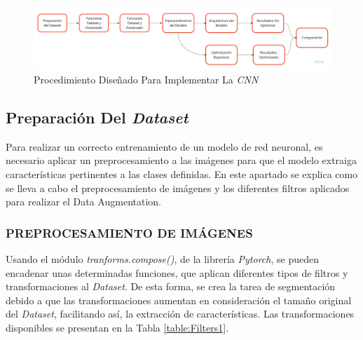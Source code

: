 \begin{figure}[ht]
	\centering
	\includegraphics[scale=0.15]{Figs/procedimiento.jpg}
	\caption{Procedimiento Diseñado Para Implementar La \textit{CNN}}
	\label{fig:procedimiento}
\end{figure}	


\newpage
\subsection{Preparación Del \textit{Dataset}}

Para realizar un correcto entrenamiento de un modelo de red neuronal, es necesario aplicar un preprocesamiento a las imágenes para que el modelo extraiga características pertinentes a las clases definidas. En este apartado se explica como se lleva a cabo el preprocesamiento de imágenes y los diferentes filtros aplicados para realizar el Data Augmentation.

\subsubsection{PREPROCESAMIENTO DE IMÁGENES}

Usando el módulo \textit{tranforms.compose()}, de la librería \textit{Pytorch}, se pueden encadenar unas determinadas funciones, que aplican diferentes tipos de filtros y transformaciones al \textit{Dataset}. De esta forma, se crea la tarea de segmentación debido a que las transformaciones aumentan en consideración el tamaño original del \textit{Dataset}, facilitando así, la extracción de características. Las transformaciones disponibles se presentan en la Tabla \ref{table:Filters1}.


